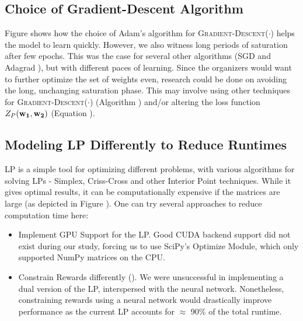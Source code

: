 \subsection{Choice of Gradient-Descent Algorithm}
Figure  shows how the choice of Adam's algorithm \cite{Adam} for \textsc{Gradient-Descent}($\cdot$) helps the model to learn quickly. However, we also witness long periods of saturation after few epochs. This was the case for several other algorithms (SGD \cite{SGD} and Adagrad \cite{Adagrad}), but with different paces of learning. Since the organizers would want to further optimize the set of weights even, research could be done on avoiding the long, unchanging saturation phase. This may involve using other techniques for \textsc{Gradient-Descent}($\cdot$) (Algorithm ) and/or altering the loss function $Z_P(\mathbf{w_1}, \mathbf{w_2})$ (Equation ).

\subsection{Modeling LP Differently to Reduce Runtimes}
LP is a simple tool for optimizing different problems, with various algorithms for solving LPs - Simplex, Criss-Cross and other Interior Point techniques. While it gives optimal results, it can be computationally expensive if the matrices are large (as depicted in Figure ). One can try several approaches to reduce computation time here:
\begin{itemize}
    \item Implement GPU Support for the LP. Good CUDA backend support did not exist during our study, forcing us to use SciPy's Optimize Module, which only supported NumPy matrices on the CPU.
    \item Constrain Rewards differently (). We were unsuccessful in implementing a dual version of the LP, interspersed with the neural network. Nonetheless, constraining rewards using a neural network would drastically improve performance as the current LP accounts for $\approx$ 90\% of the total runtime.
\end{itemize}